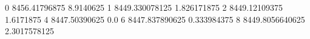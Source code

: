 0 8456.41796875 8.9140625
1 8449.330078125 1.826171875
2 8449.12109375 1.6171875
4 8447.50390625 0.0
6 8447.837890625 0.333984375
8 8449.8056640625 2.3017578125
